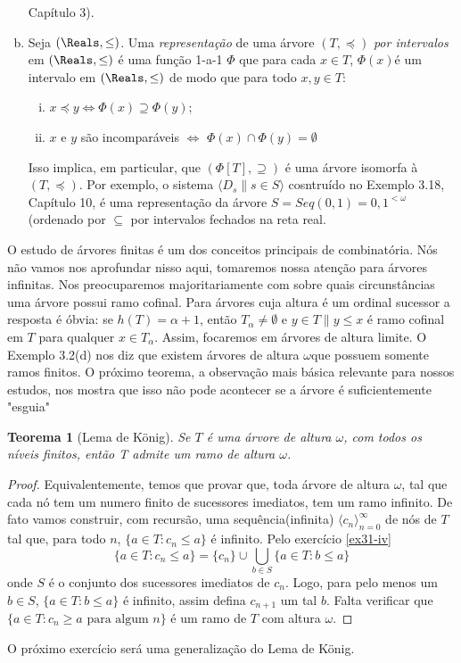 \documentclass[a4paper]{article}
\theoremstyle{plain}\newtheorem{teo}{Teorema}[section]
\theoremstyle{plain}\newtheorem{prop}[teo]{Proposição}
\theoremstyle{plain}\newtheorem{lem}[teo]{Lema}
\theoremstyle{plain}\newtheorem{cor}[teo]{Corolário}
\theoremstyle{definition}\newtheorem{defi}[teo]{Definição}
\theoremstyle{remark}\newtheorem{rem}[teo]{Observação}
\theoremstyle{definition}\newtheorem{example}[teo]{Exemplo}
\theoremstyle{remark}\newtheorem{step}{\bf Step}
\begin{document}
\begin{exemplo}
\begin{enumerate}[(a)]
    Capítulo 3).
    \item Seja \((\Reals,\leq)\). Uma \emph{representação} de uma árvore \((T,\preceq)\)
    \emph{por intervalos} em \((\Reals,\leq)\) é uma função 1-a-1 \(\Phi\) que para cada 
    \(x\in T\), \(\Phi (x)\)é um intervalo em \((\Reals,\leq)\) de modo que para todo \(x,y\in T\):
    \begin{enumerate}[(i)]
    \item \(x\preceq y\iff \Phi(x)\supseteq\Phi(y)\); 
    \item \(x\) e \(y\) são incomparáveis \(\iff\) \(\Phi(x)\cap\Phi(y) =\emptyset\)
    \end{enumerate}
    Isso implica, em particular, que \((\Phi[T],\supseteq)\) é uma árvore isomorfa à
    \((T,\preceq)\). Por exemplo, o sistema \(\langle D_s \| s\in S\rangle\) cosntruído
    no Exemplo 3.18, Capítulo 10, é uma representação da árvore \(S=Seq({0,1})={0,1}^{<\omega}\)
    (ordenado por \(\subseteq\) por intervalos fechados na reta real.
    \end{enumerate}
  \end{exemplo}
  
  
  O estudo de árvores finitas é um dos conceitos principais de combinatória. Nós não vamos
  nos aprofundar nisso aqui, tomaremos nossa atenção para árvores infinitas. Nos preocuparemos
  majoritariamente com sobre quais circunstâncias uma árvore possui ramo cofinal.
  Para árvores cuja altura é um ordinal sucessor a resposta é óbvia: se \(h(T)=\alpha +1\),
  então \(T_\alpha\neq\emptyset\) e \({y\in T\| y\leq x}\) é ramo cofinal em \(T\) para qualquer
  \(x\in T_\alpha\). Assim, focaremos em árvores de altura limite. O Exemplo 3.2(d) nos diz que
  existem árvores de altura \(\omega\)que possuem somente ramos finitos. O próximo teorema, a
  observação mais básica relevante para nossos estudos, nos mostra que isso não pode acontecer se
  a árvore é suficientemente "esguia"

    \begin{teo}[Lema de König]
  Se $T$ é uma árvore de altura $\omega$, com todos os níveis finitos, então T admite um ramo de altura $\omega$.
  \end{teo}
  \begin{proof}
  Equivalentemente, temos que provar que, toda árvore de altura $\omega$, tal que cada nó tem um numero finito de sucessores imediatos, tem um ramo infinito.
  De fato vamos construir, com recursão, uma sequência(infinita) $\langle c_n\rangle_{n=0}^{\infty}$ de nós de $T$ tal que, para todo $n$, $\{a\in T: c_n\leq a\}$ é infinito. Pelo exercício \ref{ex31-iv}
  $$
  \{a\in T: c_n\leq a\} = \{c_n\} \cup\bigcup_{b\in S} \{a\in T: b\leq a\}
  $$
  onde $S$ é o conjunto dos sucessores imediatos de $c_n$. Logo, para pelo menos um $b\in S$, $\{a\in T: b\leq a\}$ é infinito, assim defina $c_{n+1}$ um tal $b$. 
  Falta verificar que $\{a\in T: c_n\geq a \text{ para algum } n\}$ é um ramo de $T$ com altura $\omega$.
  
  \end{proof}
  O próximo exercício será uma generalização do Lema de König.
  
\end{document}
